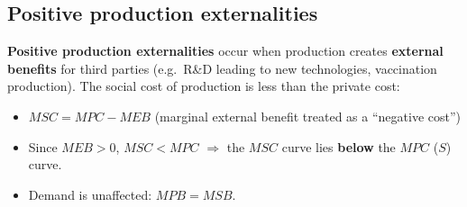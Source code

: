 \documentclass[a4paper,12pt]{article}
\begin{document}
\subsection{Positive production externalities}
\textbf{Positive production externalities} occur when production creates \textbf{external benefits} for third parties (e.g.\ R\&D leading to new technologies, vaccination production). The social cost of production is less than the private cost:
\begin{itemize}
  \item $MSC = MPC - MEB$ (marginal external benefit treated as a ``negative cost'')
  \item Since $MEB > 0$, $MSC < MPC$ $\Rightarrow$ the $MSC$ curve lies \textbf{below} the $MPC$ ($S$) curve.
  \item Demand is unaffected: $MPB = MSB$.
\end{itemize}
\end{document}
